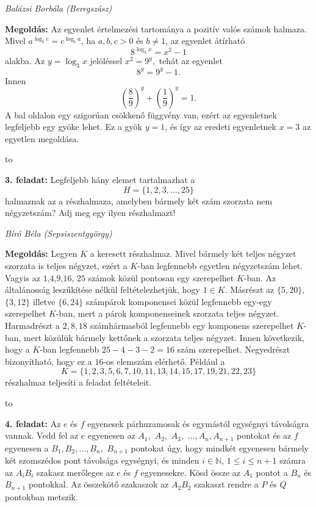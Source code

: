 \documentclass[a4paper,10pt]{article}
\newcommand{\ki}[2]{\hfill {\it #1 (#2)}\medskip}
\newcommand{\vonal}{\hbox to \hsize{\hskip2truecm\hrulefill\hskip2truecm}}
\begin{document}
\ki{Balázsi Borbála}{Beregszász}\medskip

{\bf Megoldás: }  Az egyenlet értelmezési tartománya a pozitív valós számok halmaza.
Mivel $a^{\log_b c}=c^{\log_b a}$, ha $a,b,c>0$ és $b\ne1$, az
egyenlet átírható
$$8^{\log_3 x}=x^2-1$$ alakba. Az $y={\log _3}x$ jelöléssel ${x^2}
= {9^y},$ tehát az egyenlet \[{8^y} = {9^y} - 1.\] Innen
\[{\left( {\frac{8}{9}} \right)^y} + {\left( {\frac{1}{9}}
\right)^y} = 1.\] A bal oldalon egy szigorúan csökkenő függvény
van, ezért az egyenletnek legfeljebb egy gyöke lehet. Ez a gyök $y =
1$, és így az eredeti egyenletnek $x = 3$ az egyetlen
megoldása.

\medskip

\vonal


{\bf 3. feladat: } Legfeljebb hány elemet tartalmazhat a $$H = \{1,2,3,\dots, 25\}$$
halmaznak az a részhalmaza, amelyben bármely két szám
 szorzata nem négyzetszám? Adj meg egy ilyen részhalmazt!


\ki{Bíró Béla}{Sepsiszentgyörgy}\medskip


{\bf Megoldás: }  Legyen $K$ a keresett részhalmaz. Mivel bármely két teljes négyzet szorzata is teljes négyzet,
 ezért a $K$-ban legfennebb egyetlen négyzetszám lehet. Vagyis az $1$,$4$,$9$,$16$, $25$ számok
 közül pontosan egy szerepelhet $K$-ban. Az általánosság leszűkítése nél\-kül feltételezhetjük,
 hogy $1\in K.$ Másrészt az $\{5,20\},$ $\{3,12\}$ illetve $\{6,24\}$ számpárok komponensei
közül legfennebb egy-egy szerepelhet $K$-ban, mert a párok
komponenseinek szorzata teljes négyzet. Harmadrészt a ${2,8,18}$
számhármasból legfennebb egy komponens szerepelhet $K$-ban, mert
közülük bármely kettőnek a szorzata teljes négyzet. Innen
következik, hogy a $K$-ban legfennebb $25-4-3-2 = 16$ szám
szerepelhet. Negyedrészt bizonyítható, hogy ez a $16$-os elemszám
elérhető. Például a
$$K =\{1,2,3,5,6,7,10,11,13,14,15,17,19,21,22,23\}$$ részhalmaz
teljesíti a feladat feltételeit.

\medskip

\vonal

{\bf 4. feladat: } Az $e$ és $f$ egyenesek párhuzamosak és egymástól
egységnyi távolságra vannak. Vedd fel az $e$ egyenesen az
$A_1,$ $A_2,$ $A_3,$ $\dots, A_n, A_{n+1}$ pontokat és az $f$
egyenesen a $B_1, B_2, \dots, B_n,$ $B_{n+1}$ pontokat úgy, hogy
mindkét egyenesen bármely két szomszédos pont távolsága
egységnyi, és minden $i\in\mathbb{N}$, $1\le i\le n+1$ számra
az $A_iB_i$ szakasz merőleges az $e$ és $f$ egyenesekre. Kösd
össze az $A_1$ pontot a $B_n$ és $B_{n+1}$ pontokkal. Az
összekötő sza\-ka\-szok az $A_2B_2$ szakaszt rendre a $P$
és $Q$ pontokban metszik.
\end{document}
